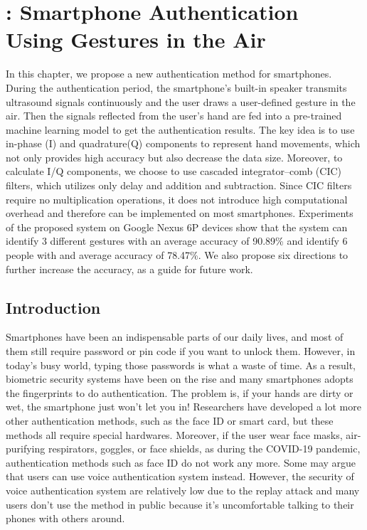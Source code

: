 \chapter{{\uu}: Smartphone Authentication \protect \\ Using Gestures in the Air}

In this chapter, we propose a new authentication method for smartphones. During the authentication period, the smartphone's built-in speaker transmits ultrasound signals continuously and the user draws a user-defined gesture in the air. Then the signals reflected from the user's hand are fed into a pre-trained machine learning model to get the authentication results. The key idea is to use in-phase (I) and quadrature(Q) components to represent hand movements, which not only provides high accuracy but also decrease the data size. Moreover, to calculate I/Q components, we choose to use cascaded integrator–comb (CIC) filters, which utilizes only delay and addition and subtraction. Since CIC filters require no multiplication operations, it does not introduce high computational overhead and therefore can be implemented on most smartphones. Experiments of the proposed {\uu} system on Google Nexus 6P devices show that the system can identify 3 different gestures with an average accuracy of 90.89\% and identify 6 people with and average accuracy of 78.47\%. We also propose six directions to further increase the accuracy, as a guide for future work.


\section{Introduction}
Smartphones have been an indispensable parts of our daily lives, and most of them still require password or pin code if you want to unlock them. However, in today’s busy world, typing those passwords is what a waste of time. As a result, biometric security systems have been on the rise and many smartphones adopts the fingerprints to do authentication. The problem is, if your hands are dirty or wet, the smartphone just won’t let you in! Researchers have developed a lot more other authentication methods, such as the face ID or smart card, but these methods all require special hardwares. Moreover, if the user wear face masks, air-purifying respirators, goggles, or face shields, as during the COVID-19 pandemic, authentication methods such as face ID do not work any more. Some may argue that users can use voice authentication system instead. However, the security of voice authentication system are relatively low due to the replay attack and many users don't use the method in public because it’s uncomfortable talking to their phones with others around.

